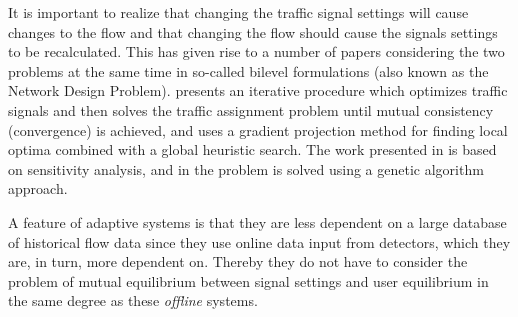 It is important to realize that changing the traffic signal settings
will cause changes to the flow and that changing the flow should cause
the signals settings to be recalculated. This has given rise to a
number of papers considering the two problems at the same time in
so-called bilevel formulations (also known as the Network Design
Problem). \cite{mc} presents an iterative procedure which optimizes
traffic signals and then solves the traffic assignment problem until
mutual consistency (convergence) is achieved, and \cite{34} uses a
gradient projection method for finding local optima combined with a
global heuristic search. The work presented in \cite{20} is based on
sensitivity analysis, and in \cite{2,27} the problem is solved using a
genetic algorithm approach.

A feature of adaptive systems is that they are less dependent on a
large database of historical flow data since they use online data
input from detectors, which they are, in turn, more dependent
on. Thereby they do not have to consider the problem of mutual
equilibrium between signal settings and user equilibrium in the same
degree as these \textit{offline} systems.
